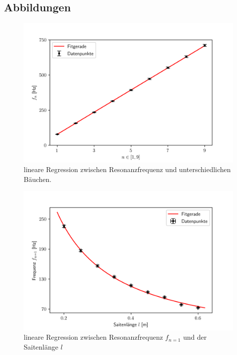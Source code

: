 \documentclass[bibliography=totocnumbered]{scrartcl}
\begin{document}
	\subsection{Abbildungen}
	\begin{figure}[!ht]
		\centering									%
		\includegraphics[width=350pt]{fotos/gpr1/Regression_A1.png}			%
		\caption{lineare Regression zwischen Resonanzfrequenz und unterschiedlichen Bäuchen.}							%
		\label{Abb: Regression 1}							%
	\end{figure}
\begin{figure}[!ht]
	\centering									%
	\includegraphics[width=350pt]{fotos/gpr1/Regression_A2.png}			%
	\caption{lineare Regression zwischen Resonanzfrequenz $f_{n=1}$ und der Saitenlänge $l$ }							%
	\label{Abb: Regression 2}							%
\end{figure}
\end{document}
